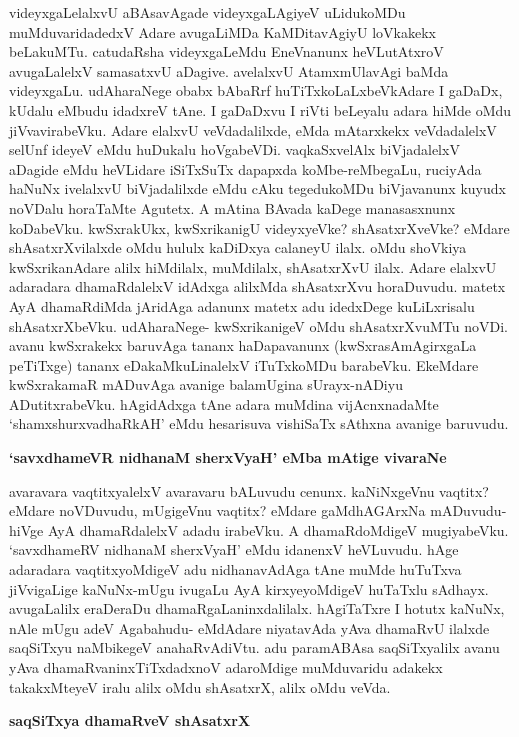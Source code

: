 videyxgaLelalxvU aBAsavAgade videyxgaLAgiyeV uLidukoMDu muMduvaridadedxV Adare avugaLiMDa KaMDitavAgiyU loVkakekx beLakuMTu. catudaRsha videyxgaLeMdu EneVnanunx heVLutAtxroV avugaLalelxV samasatxvU aDagive. avelalxvU AtamxmUlavAgi baMda videyxgaLu. udAharaNege obabx bAbaRrf huTiTxkoLaLxbeVkAdare I gaDaDx, kUdalu eMbudu idadxreV tAne. I gaDaDxvu I riVti beLeyalu adara hiMde oMdu jiVvavirabeVku. Adare elalxvU veVdadalilxde, eMda mAtarxkekx veVdadalelxV selUnf ideyeV eMdu huDukalu hoVgabeVDi. vaqkaSxvelAlx biVjadalelxV aDagide eMdu heVLidare iSiTxSuTx dapapxda koMbe-reMbegaLu, ruciyAda haNuNx ivelalxvU biVjadalilxde eMdu cAku tegedukoMDu biVjavanunx kuyudx noVDalu horaTaMte Agutetx. A mAtina BAvada kaDege manasasxnunx koDabeVku. kwSxrakUkx, kwSxrikanigU videyxyeVke? shAsatxrXveVke? eMdare shAsatxrXvilalxde oMdu hululx kaDiDxya calaneyU ilalx. oMdu shoVkiya kwSxrikanAdare alilx hiMdilalx, muMdilalx, shAsatxrXvU ilalx. Adare elalxvU adaradara dhamaRdalelxV idAdxga alilxMda shAsatxrXvu horaDuvudu. matetx AyA dhamaRdiMda jAridAga adanunx matetx adu idedxDege kuLiLxrisalu shAsatxrXbeVku. udAharaNege- kwSxrikanigeV oMdu shAsatxrXvuMTu noVDi. avanu kwSxrakekx baruvAga tananx haDapavanunx (kwSxrasAmAgirxgaLa peTiTxge) tananx eDakaMkuLinalelxV iTuTxkoMDu barabeVku. EkeMdare kwSxrakamaR mADuvAga avanige balamUgina sUrayx-nADiyu ADutitxrabeVku. hAgidAdxga tAne adara muMdina vijAcnxnadaMte `shamxshurxvadhaRkAH' eMdu hesarisuva vishiSaTx sAthxna avanige baruvudu.

\noindent
{\bf\large{`savxdhameVR nidhanaM sherxVyaH' eMba mAtige vivaraNe}}\label{197}

avaravara vaqtitxyalelxV avaravaru bALuvudu cenunx. kaNiNxgeVnu vaqtitx? eMdare noVDuvudu, mUgigeVnu vaqtitx? eMdare gaMdhAGArxNa mADuvudu- hiVge AyA dhamaRdalelxV adadu irabeVku. A dhamaRdoMdigeV mugiyabeVku. `savxdhameRV nidhanaM sherxVyaH' eMdu idanenxV heVLuvudu. hAge adaradara vaqtitxyoMdigeV adu nidhanavAdAga tAne muMde huTuTxva jiVvigaLige kaNuNx-mUgu ivugaLu AyA kirxyeyoMdigeV huTaTxlu sAdhayx. avugaLalilx eraDeraDu dhamaRgaLaninxdalilalx. hAgiTaTxre I hotutx kaNuNx, nAle mUgu adeV Agabahudu- eMdAdare niyatavAda yAva dhamaRvU ilalxde saqSiTxyu naMbikegeV anahaRvAdiVtu. adu paramABAsa saqSiTxyalilx avanu yAva dhamaRvaninxTiTxdadxnoV adaroMdige muMduvaridu adakekx takakxMteyeV iralu alilx oMdu shAsatxrX, alilx oMdu veVda.

\noindent
{\bf\large{saqSiTxya dhamaRveV shAsatxrX}}

